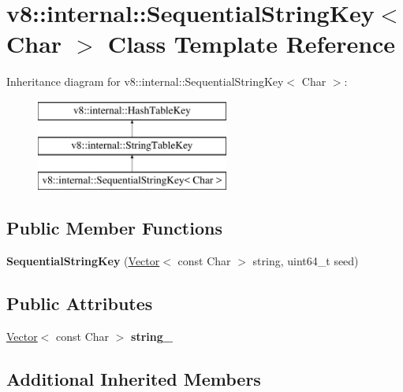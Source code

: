 \hypertarget{classv8_1_1internal_1_1SequentialStringKey}{}\section{v8\+:\+:internal\+:\+:Sequential\+String\+Key$<$ Char $>$ Class Template Reference}
\label{classv8_1_1internal_1_1SequentialStringKey}
Inheritance diagram for v8\+:\+:internal\+:\+:Sequential\+String\+Key$<$ Char $>$\+:\begin{figure}[H]
\begin{center}
\leavevmode
\includegraphics[height=3.000000cm]{classv8_1_1internal_1_1SequentialStringKey}
\end{center}
\end{figure}
\subsection*{Public Member Functions}
\begin{DoxyCompactItemize}
\item 
\mbox{\label{classv8_1_1internal_1_1SequentialStringKey_a12bf379765cc2f08e4ddaa870c849fb5}} 
{\bfseries Sequential\+String\+Key} (\mbox{\hyperlink{classv8_1_1internal_1_1Vector}{Vector}}$<$ const Char $>$ string, uint64\+\_\+t seed)
\end{DoxyCompactItemize}
\subsection*{Public Attributes}
\begin{DoxyCompactItemize}
\item 
\mbox{\label{classv8_1_1internal_1_1SequentialStringKey_ad2ffeb3bb3a97b6b34cc541ca6cc4c60}} 
\mbox{\hyperlink{classv8_1_1internal_1_1Vector}{Vector}}$<$ const Char $>$ {\bfseries string\+\_\+}
\end{DoxyCompactItemize}
\subsection*{Additional Inherited Members}


